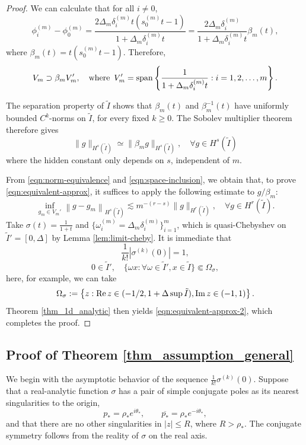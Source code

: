 \documentclass{article}
\numberwithin{equation}{section}
\def\lt{\left}
\def\rt{\right}
\begin{document}
\begin{proof}
    We can calculate that for all $i\neq 0$,  $$\phi_i^{(m)}-\phi_0^{(m)} = \frac{2\Delta_m\delta_i^{(m)}t (s_0^{(m)} t-1)}{1+\Delta_m\delta_i^{(m)}t} = \frac{2\Delta_m\delta_i^{(m)}}{1+\Delta_m\delta_i^{(m)}t}\beta_m(t),$$
    where $\beta_m(t)=t(s_0^{(m)} t-1)$. Therefore, 
    \begin{equation}\label{eqn:space-inclusion}
        V_m\supset \beta_m V_m',\quad\text{where }\, V_m' = {\rm span} \lt\{\frac{1}{1+\Delta_m\delta_i^{(m)}t}:i=1,2,\ldots,m\rt\}. 
    \end{equation}
    
    The separation property of $\tilde I$ shows that $\beta_m(t)$ and $\beta_m^{-1}(t)$ have uniformly bounded \(C^k\)-norms on $\tilde I$, for every fixed \(k\geq 0\). The Sobolev multiplier theorem therefore gives
    \begin{equation}\label{eqn:norm-equivalence}
        \|g\|_{H^s(\tilde I)} \simeq \|\beta_m g\|_{H^s(\tilde I)},\quad \forall g\in H^s(\tilde I)
    \end{equation}
    where the hidden constant only depends on $s$, independent of $m$.
    
    From \eqref{eqn:norm-equivalence} and \eqref{eqn:space-inclusion}, we obtain that, to prove \eqref{eqn:equivalent-approx}, it suffices to apply the following estimate to $g/\beta_m$:
    \begin{equation}\label{eqn:equivalent-approx-2}
        \inf_{g_m\in V_m'} \lt\|g - g_m\rt\|_{H^s(\tilde I)}\lesssim m^{-(r-s)} \|g\|_{H^r(\tilde I)}, \quad\forall g\in H^r(\tilde I).
    \end{equation}
    Take $\sigma(t) = \frac{1}{1+t}$ and $\{\omega_i^{(m)} = \Delta_m\delta_i^{(m)}\}_{i=1}^m$, which is quasi-Chebyshev on $\tilde I'=[0,\Delta]$ by Lemma \ref{lem:limit-cheby}. It is immediate that 
    $$\frac{1}{k!}|\sigma^{(k)}(0)| = 1,$$
    $$ 0\in \tilde I', \quad \{\omega x:\forall \omega\in \tilde I',x\in \tilde I\}\Subset \Omega_\sigma,$$
    here, for example, we can take
    $$\Omega_\sigma := \lt\{z: {\rm Re}\,z\in (-1/2,1+\Delta\sup\tilde I),{\rm Im}\,z\in (-1,1)\rt\}.$$
    Theorem \ref{thm_1d_analytic} then yields \eqref{eqn:equivalent-approx-2}, which completes the proof.
\end{proof}

\subsection{Proof of Theorem \ref{thm_assumption_general}}
    We begin with the asymptotic behavior of the sequence $\frac{1}{k!}\sigma^{(k)}(0)$. Suppose that a real-analytic function $\sigma$ has a pair of simple conjugate poles as its nearest singularities to the origin,
    \[
    p_\ast=\rho_\ast e^{i\theta_\ast},
    \qquad
    \overline{p_\ast}=\rho_\ast e^{-i\theta_\ast},
    \]
    and that there are no other singularities in \(|z|\leq R\), where \(R>\rho_\ast\). The conjugate symmetry follows from the reality of \(\sigma\) on the real axis.
    
\end{document}
